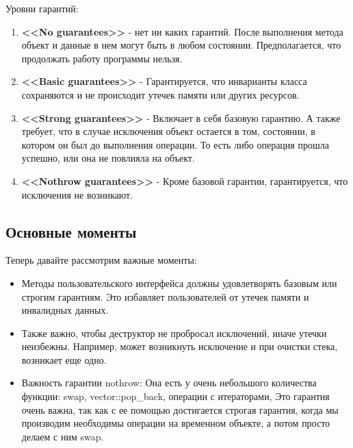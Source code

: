 Уровни гарантий:
\begin{enumerate}
\item \textbf{<<No guarantees>>} - нет ни каких гарантий. После выполнения метода объект и данные в нем могут быть в любом состоянии. Предполагается, что продолжать работу программы нельзя. %
\item \textbf{<<Basic guarantees>>} - Гарантируется, что инварианты класса сохраняются и не происходит утечек памяти или других ресурсов.
\item \textbf{<<Strong guarantees>>} - Включает в себя базовую гарантию. А также требует, что в случае исключения объект остается в том, состоянии, в котором он был до выполнения операции. То есть либо операция прошла успешно, или она не повлияла на объект.
\item \textbf{<<Nothrow guarantees>>} - Кроме базовой гарантии, гарантируется, что исключения не возникают.
\end{enumerate}

\subsection{Основные моменты}

Теперь давайте рассмотрим важные моменты:
\begin{itemize}
\item Методы пользовательского интерфейса должны удовлетворять базовым или строгим гарантиям. Это избавляет пользователей от утечек памяти и инвалидных данных. %

\item Также важно, чтобы деструктор не пробросал исключений, иначе утечки неизбежны. Например, может возникнуть исключение и при очистки стека, возникает еще одно. %

\item Важность гарантии nothrow:
Она есть у очень небольшого количества функции: swap, vector::pop\_back, операции с итераторами, Это гарантия очень важна, так как с ее помощью достигается строгая гарантия, когда мы производим необходимы операции на временном объекте, а потом просто делаем с ним swap.
\end{itemize}

